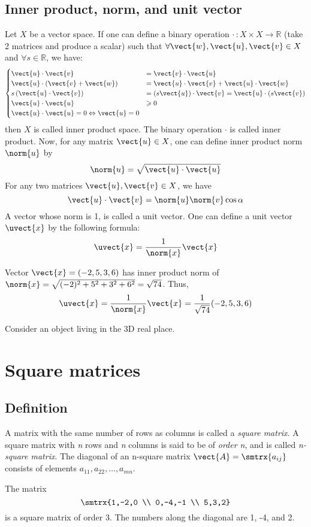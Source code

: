 \subsection{Inner product, norm, and unit vector}
Let $X$ be a vector space. If one can define a binary operation $\cdot \, : X \times X \rightarrow \mathbb{R}$ (take 2 matrices and produce a scalar) such that $\forall \vect{w},\vect{u},\vect{v}\in X$ and $\forall s\in \mathbb{R}$, we have:
\begin{equation*}
\begin{cases}
    \vect{u} \cdot \vect{v} &= \vect{v} \cdot \vect{u} \\
    \vect{u} \cdot \left( \vect{v}+\vect{w} \right) &= \vect{u} \cdot \vect{v} + \vect{u} \cdot \vect{w} \\
    s\left( \vect{u} \cdot \vect{v} \right) &= \left( s\vect{u} \right)\cdot \vect{v}=\vect{u} \cdot \left( s\vect{v} \right) \\
    \vect{u} \cdot \vect{u} & \geqslant 0 \\
    \vect{u} \cdot \vect{u} = 0 \Leftrightarrow \vect{u}=0
\end{cases}
\end{equation*}
then $X$ is called inner product space. The binary operation $\cdot$ is called inner product. Now, for any matrix $\vect{u}\in X$, one can define inner product norm $\norm{u}$ by \[ \norm{u}=\sqrt{\vect{u} \cdot \vect{u}} \]
For any two matrices $\vect{u},\vect{v}\in X$, we have \[ \vect{u} \cdot \vect{v} = \norm{u}\norm{v}\cos \alpha \]
A vector whose norm is 1, is called a unit vector. One can define a unit vector $\uvect{x}$ by the following formula: \[ \uvect{x}=\frac{1}{\norm{x}}\vect{x} \]
\begin{example}
Vector $\vect{x}=(-2,5,3,6)$ has inner product norm of $\norm{x}=\sqrt{(-2)^2+5^2+3^2+6^2}=\sqrt{74}$. Thus, \[ \uvect{x}=\frac{1}{\norm{x}}\vect{x}=\frac{1}{\sqrt{74}} (-2,5,3,6) \]
\end{example}
\begin{example}
Consider an object living in the 3D real place.
\end{example}
\section{Square matrices}
\subsection{Definition}
A matrix with the same number of rows as columns is called a \emph{square matrix}. A square matrix with \emph{n} rows and \emph{n} columns is said to be of \emph{order n}, and is called \emph{n-square matrix}. The diagonal of an n-square matrix $\vect{A}=\smtrx{a_{ij}}$ consists of elements $a_{11},a_{22},\ldots , a_{mn}$.
\begin{example}
The matrix \[ \smtrx{1,-2,0 \\ 0,-4,-1 \\ 5,3,2} \] is a square matrix of order 3. The numbers along the diagonal are 1, -4, and 2.
\end{example}

